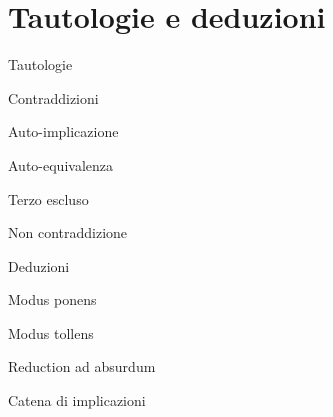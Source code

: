 \chapter{Tautologie e deduzioni}
\label{ch:deduzioni}

Tautologie

Contraddizioni

Auto-implicazione

Auto-equivalenza

Terzo escluso

Non contraddizione

Deduzioni

Modus ponens

Modus tollens

Reduction ad absurdum

Catena di implicazioni